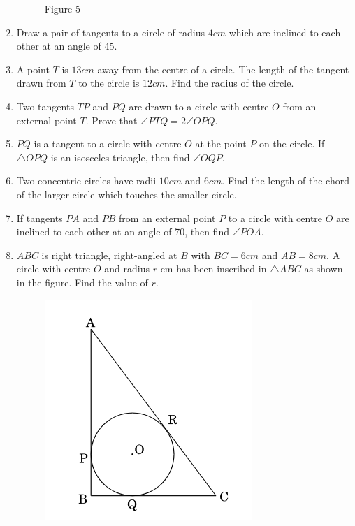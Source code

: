\documentclass{article}
\begin{document}
\begin{enumerate}
\begin{figure}[!htb]
		\caption{Figure 5}
		\label{fig:my_label}
	\end{figure}
	\item Draw a pair of tangents to a circle of radius $4 cm$ which are inclined to each other at an angle of 45\degree.	
	\item A point $T$ is $13 cm$ away from the centre of a circle. The length of the tangent drawn from $T$ to the circle is $12 cm$. Find the radius of the circle.
	\item Two tangents $TP$ and $PQ$ are drawn to a circle with centre $O$ from an external point $T$. Prove that $\angle PTQ = 2 \angle OPQ$.
	\item $PQ$ is a tangent to a circle with centre $O$ at the point $P$ on the circle. If $\triangle OPQ$ is an isosceles triangle, then find $\angle OQP$.
	\item Two concentric circles have radii $10 cm$ and $6 cm$. Find the length of the chord of the larger circle which touches the smaller circle.
	\item If tangents $PA$ and $PB$ from an external point $P$ to a circle with centre $O$ are inclined to each other at an angle of 70\degree, then find $\angle POA$.
	\item $ABC$ is right triangle, right-angled at $B$ with $BC = 6 cm$ and $AB = 8 cm$. A circle with centre $O$ and radius $r$ cm has been inscribed in $\triangle ABC$ as shown in the figure. Find the value of $r$.
		\begin{figure}[H]
			\centering
			\includegraphics[width=\columnwidth]{fig2.png}

\end{figure}
\end{enumerate}
\end{document}
